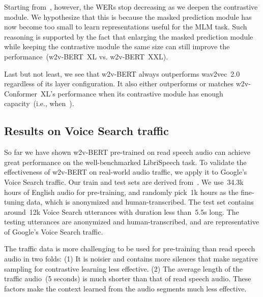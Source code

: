 \documentclass{article}
\begin{document}
Starting from~, however, the WERs stop decreasing as we deepen the contrastive module.
We hypothesize that this is because the masked prediction module has now become too small to learn representations useful for the MLM task.
Such reasoning is supported by the fact that enlarging the masked prediction module while keeping the contrastive module the same size can still improve the performance~(w2v-BERT~XL vs. w2v-BERT~XXL).

Last but not least, we see that w2v-BERT always outperforms wav2vec~2.0 regardless of its layer configuration.
It also either outperforms or matches w2v-Conformer~XL's performance when its contrastive module has enough capacity~(i.e., when~).





\subsection{Results on Voice Search traffic}







So far we have shown w2v-BERT pre-trained on read speech audio can achieve great performance on the well-benchmarked LibriSpeech task.
To validate the effectiveness of w2v-BERT on real-world audio traffic, we apply it to Google's Voice Search traffic.
Our train and test sets are derived from~\cite{li2021scaling}.
We use~34.3k hours of English audio for pre-training, and randomly pick~1k hours as the fine-tuning data, which is anonymized and human-transcribed.
The test set contains around~12k Voice Search utterances with duration less than~5.5s long.
The testing utterances are anonymized and human-transcribed, and are representative of Google’s Voice Search traffic.

The traffic data is more challenging to be used for pre-training than read speech audio in two folds: (1) It is noisier and contains more silences that make negative sampling for contrastive learning less effective.
(2) The average length of the traffic audio~(5 seconds) is much shorter than that of read speech audio.
These factors make the context learned from the audio segments much less effective.
\end{document}
